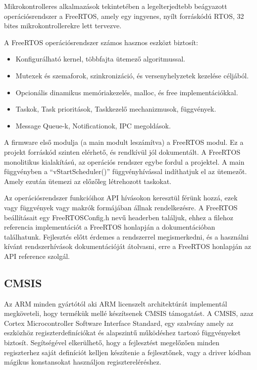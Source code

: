 Mikrokontrolleres alkalmazások tekintetében a legelterjedtebb beágyazott
operációsrendszer a FreeRTOS, amely egy ingyenes, nyílt forráskódú RTOS, 32 bites
mikrokontrollerekre lett tervezve.

A FreeRTOS operációsrendszer számos hasznos eszközt biztosít:

\begin{itemize}
\item{Konfigurálható kernel, többfajta ütemező algoritmussal.}
\item{Mutexek és szemaforok, szinkronizáció, és versenyhelyzetek kezelése
  céljából.}
\item{Opcionális dinamikus memóriakezelés, malloc, és free implementációkkal.}
\item{Taskok, Task prioritások, Taskkezelő mechanizmusok, függvények.}
\item{Message Queue-k, Notificationok, IPC megoldások.}
\end{itemize}

A firmware első modulja (a main modult leszámítva) a FreeRTOS modul. Ez a projekt
forráskód szinten elérhető, és rendkívül jól dokumentált. A FreeRTOS monolitikus
kialakítású, az operációs rendszer egybe fordul a projektel. A main függvényben a
``vStartScheduler()'' függvényhívással indíthatjuk el az ütemezőt. Amely ezután
ütemezi az előzőleg létrehozott taskokat.

Az operációsrendszer funkcióihoz API hívásokon keresztül férünk hozzá, ezek vagy
függvények vagy makrók formájában állnak rendelkezésre. A FreeRTOS beállításait
egy FreeRTOSConfig.h nevű headerben találjuk, ehhez a filehoz referencia
implementációt a FreeRTOS honlapján a dokumentációban találhatunk. Fejlesztés
előtt érdemes a rendszerrel megismerkedni, és a használni kívánt rendszerhívások
dokumentációját átolvasni, erre a FreeRTOS honlapján az API
reference\cite{FreertosApiReference} szolgál.

\subsection{CMSIS}

Az ARM minden gyártótól aki ARM licenszelt architektúrát implementál megköveteli,
hogy termékük mellé készítsenek CMSIS támogatást. A CMSIS, azaz Cortex
Microcontroller Software Interface Standard, egy szabvány amely az eszközhöz
regiszterdefiníciókat és alapszintű működéshez tartozó függvényeket
biztosít. Segítségével elkerülhető, hogy a fejlesztést megelőzően minden
regiszterhez saját definíciót kelljen készítenie a fejlesztőnek, vagy a driver
kódban mágikus konstansokat használjon regisztereléréshez.

